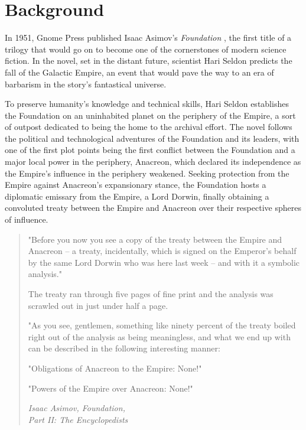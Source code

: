 \section{Background}

In 1951, Gnome Press published Isaac Asimov's \emph{Foundation} \citep{asimov1951foundation}, the first title of a trilogy that would go on to become one of the cornerstones of modern science fiction.
In the novel, set in the distant future, scientist Hari Seldon predicts the fall of the Galactic Empire, an event that would pave the way to an era of barbarism in the story's fantastical universe.

To preserve humanity's knowledge and technical skills, Hari Seldon establishes the Foundation on an uninhabited planet on the periphery of the Empire, a sort of outpost dedicated to being the home to the archival effort.
The novel follows the political and technological adventures of the Foundation and its leaders, with one of the first plot points being the first conflict between the Foundation and a major local power in the periphery, Anacreon, which declared its independence as the Empire's influence in the periphery weakened.
Seeking protection from the Empire against Anacreon's expansionary stance, the Foundation hosts a diplomatic emissary from the Empire, a Lord Dorwin, finally obtaining a convoluted treaty between the Empire and Anacreon over their respective spheres of influence.

\begin{quote}
    "Before you now you see a copy of the treaty between the Empire and Anacreon – a treaty, incidentally, which is signed on the Emperor's behalf by the same Lord Dorwin who was here last week – and with it a symbolic analysis."

    The treaty ran through five pages of fine print and the analysis was scrawled out in just under half a page.

    "As you see, gentlemen, something like ninety percent of the treaty boiled right out of the analysis as being meaningless, and what we end up with can be described in the following interesting manner:

    "Obligations of Anacreon to the Empire: None!"

    "Powers of the Empire over Anacreon: None!"

    \vspace{0.2cm}

    \begin{flushright}
        \small \emph{Isaac Asimov, Foundation,\\Part II: The Encyclopedists}
    \end{flushright}
\end{quote}

